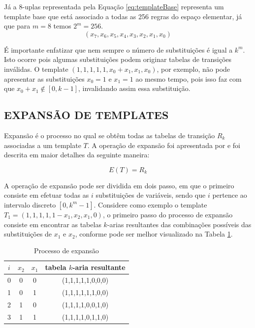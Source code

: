 \documentclass[12pt,a4paper]{article}
\begin{document}
Já a $8$-uplas representada pela Equação \ref{eq:templateBase} representa um template base que está associado a todas as 256 regras do espaço elementar, já que para $m = 8$ temos $2^m = 256 $.
\begin{equation}
(x_7,x_6,x_5,x_4,x_3,x_2,x_1,x_0)
\label{eq:templateBase}
\end{equation}

É importante enfatizar que nem sempre o número de substituições é igual a $k^m$. Isto ocorre pois algumas substituições podem originar tabelas de transições inválidas. O template $(1,1,1,1,1,x_0+x_1,x_1,x_0)$, por exemplo, não pode apresentar as substituições $x_0=1$ e $x_1=1$ ao mesmo tempo, pois isso faz com que $x_0 + x_1 \notin [0, k-1]$, invalidando assim essa substituição.

\newpage\newpage
\subsection{EXPANSÃO DE TEMPLATES}
	Expansão é o processo no qual se obtêm todas as tabelas de transição $R_k$ associadas a um template $T$.
	A operação de expansão foi apresentada por \cite{daCosta2014} e foi descrita em maior detalhes da seguinte maneira:

	\begin{equation}
	E(T)=R_k
	\end{equation}

	A operação de expansão pode ser dividida em dois passo, em que o primeiro consiste em efetuar todas as $i$ substituições de variáveis, sendo que $i$ pertence ao intervalo discreto $[0,k^m-1]$. Considere como exemplo o template $T_1 = (1,1,1,1,1-x_1,x_2,x_1,0)$, o primeiro passo do processo de expansão consiste em encontrar as tabelas $k$-arias resultantes das combinações possíveis das substituições de $x_1$ e $x_2$, conforme pode ser melhor visualizado na Tabela \ref{tab:expansionProcess}.

	\begin{table}[h!]
	\centering
	\caption{Processo de expansão}
	{
		\vspace{0.3cm}
		\begin{tabular}{cccc}
		\hline
		$i$ & $x_2$ & $x_1$ & tabela $k$-aria resultante \\
		\hline
		0	&	0	&	0	&	(1,1,1,1,1,0,0,0)	\\
		1	&	0	&	1	&	(1,1,1,1,1,1,0,0)	\\
		2	&	1	&	0	&	(1,1,1,1,0,0,1,0)	\\
		3	&	1	&	1	&	(1,1,1,1,0,1,1,0)	\\
		\hline
		\end{tabular}
	}
	\label{tab:expansionProcess}
	\end{table}
\end{document}
